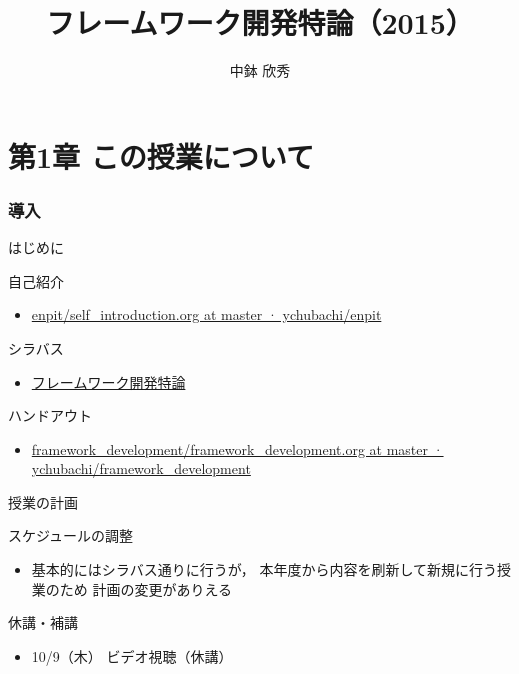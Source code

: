 \documentclass[t, aspectratio=169]{beamer}
\date{\insertpart}
\institute[AIIT]{産業技術大学院大学(AIIT)}
\author{中鉢 欣秀}
\date{}
\title{フレームワーク開発特論（2015）}
\begin{document}
\maketitle

\part{第1章 この授業について}
\label{sec-1}
\section{導入}
\label{sec-1-1}
\begin{frame}[label=sec-1-1-1]{はじめに}
\begin{block}{自己紹介}
\begin{itemize}
\item \href{https://github.com/ychubachi/enpit/blob/master/slides/self_introduction.org}{enpit/self\_introduction.org at master · ychubachi/enpit}
\end{itemize}
\end{block}
\begin{block}{シラバス}
\begin{itemize}
\item \href{http://aiit.ac.jp/master_program/isa/lecture/pdf/h26/4_6.pdf}{フレームワーク開発特論}
\end{itemize}
\end{block}
\begin{block}{ハンドアウト}
\begin{itemize}
\item \href{https://github.com/ychubachi/framework_development/blob/master/slides/framework_development.org}{framework\_development/framework\_development.org at master · ychubachi/framework\_development}
\end{itemize}
\end{block}
\end{frame}
\begin{frame}[label=sec-1-1-2]{授業の計画}
\begin{block}{スケジュールの調整}
\begin{itemize}
\item 基本的にはシラバス通りに行うが，
本年度から内容を刷新して新規に行う授業のため
計画の変更がありえる
\end{itemize}
\end{block}
\begin{block}{休講・補講}
\begin{itemize}
\item 10/9（木） ビデオ視聴（休講）
\end{itemize}
\end{block}
\end{frame}
\end{document}
